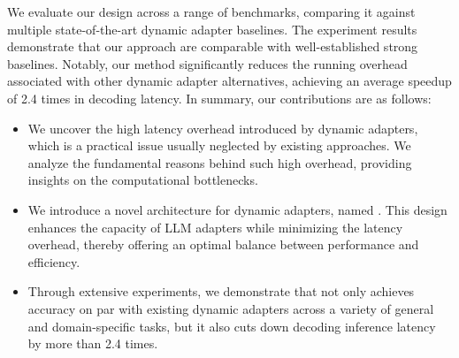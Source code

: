 % 
We evaluate our \sys design across a range of benchmarks, comparing it against multiple state-of-the-art dynamic adapter baselines. The experiment results demonstrate that our approach are comparable with well-established strong baselines. Notably, our method significantly reduces the running overhead associated with other dynamic adapter alternatives, achieving an average speedup of 2.4 times in decoding latency.
% 
In summary, our contributions are as follows:
\begin{itemize}
\item We uncover the high latency overhead introduced by dynamic adapters, which is a practical issue usually neglected by existing approaches. We analyze the fundamental reasons behind such high overhead, providing insights on the computational bottlenecks.
\item We introduce a novel architecture for dynamic adapters, named \sys. This design enhances the capacity of LLM adapters while minimizing the latency overhead, thereby offering an optimal balance between performance and efficiency.
\item Through extensive experiments, we demonstrate that \sys not only achieves accuracy on par with existing dynamic adapters across a variety of general and domain-specific tasks, but it also cuts down decoding inference latency by more than 2.4 times.
\end{itemize}

